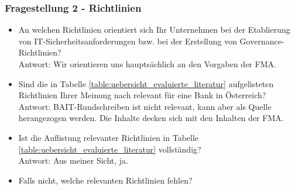 \subsubsection{Fragestellung 2 - Richtlinien}
\begin{itemize}
    \item An welchen Richtlinien orientiert sich Ihr Unternehmen bei der Etablierung von IT-Sicherheitsanforderungen bzw. bei der Erstellung von Governance-Richtlinien?\\
    Antwort: Wir orientieren uns hauptsächlich an den Vorgaben der FMA.\\
    \item Sind die in Tabelle \ref{table:uebersicht_evaluierte_literatur} aufgelisteten Richtlinien Ihrer Meinung nach relevant für eine Bank in Österreich?\\
    Antwort: BAIT-Rundschreiben ist nicht relevant, kann aber als Quelle herangezogen werden. Die Inhalte decken sich mit den Inhalten der FMA.\\
    \item Ist die Auflistung relevanter Richtlinien in Tabelle \ref{table:uebersicht_evaluierte_literatur} vollständig?\\
    Antwort: Aus meiner Sicht, ja.\\
    \item Falls nicht, welche relevanten Richtlinien fehlen?
\end{itemize}
\bigbreak
